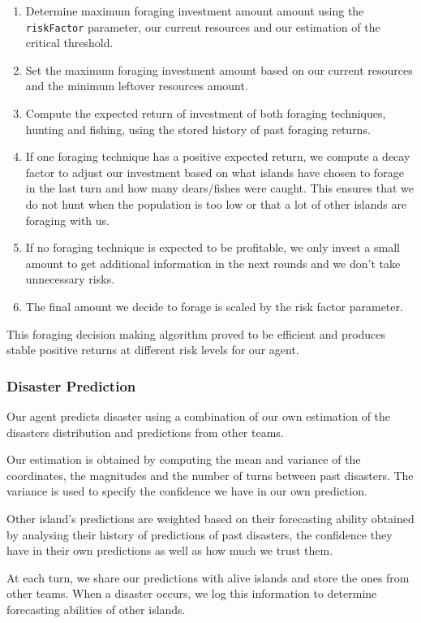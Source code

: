 \begin{enumerate}
    \item Determine maximum foraging investment amount amount using the \texttt{riskFactor} parameter, our current resources and our estimation of the critical threshold.
    \item Set the maximum foraging investment amount based on our current resources and the minimum leftover resources amount.
    \item Compute the expected return of investment of both foraging techniques, hunting and fishing, using the stored history of past foraging returns. 
    \item If one foraging technique has a positive expected return, we compute a decay factor to adjust our investment based on what islands have chosen to forage in the last turn and how many dears/fishes were caught. This ensures that we do not hunt when the population is too low or that a lot of other islands are foraging with us.
    \item If no foraging technique is expected to be profitable, we only invest a small amount to get additional information in the next rounds and we don't take unnecessary risks.  
    \item The final amount we decide to forage is scaled by the risk factor parameter.
\end{enumerate}

This foraging decision making algorithm proved to be efficient and produces stable positive returns at different risk levels for our agent.

\subsubsection{Disaster Prediction}

Our agent predicts disaster using a combination of our own estimation of the disasters distribution and predictions from other teams.

Our estimation is obtained by computing the mean and variance of the coordinates, the magnitudes and the number of turns between past disasters. The variance is used to specify the confidence we have in our own prediction.

Other island's predictions are weighted based on their forecasting ability obtained by analysing their history of predictions of past disasters, the confidence they have in their own predictions as well as how much we trust them.

At each turn, we share our predictions with alive islands and store the ones from other teams. When a disaster occurs, we log this information to determine forecasting abilities of other islands.

